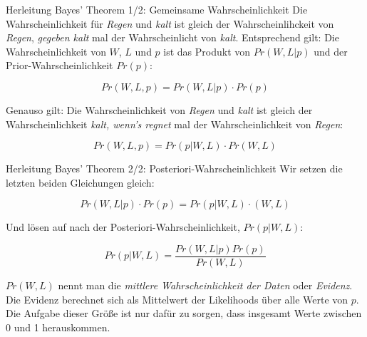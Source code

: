 \documentclass[
  ngerman,
  ignorenonframetext,
]{beamer}
\begin{document}
\begin{frame}{Herleitung Bayes' Theorem 1/2: Gemeinsame
Wahrscheinlichkeit}
\protect\hypertarget{herleitung-bayes-theorem-12-gemeinsame-wahrscheinlichkeit}{}
Die Wahrscheinlichkeit für \emph{Regen} und \emph{kalt} ist gleich der
Wahrscheinlihckeit von \emph{Regen}, \emph{gegeben kalt} mal der
Wahrscheinlicht von \emph{kalt}. Entsprechend gilt: Die
Wahrscheinlichkeit von \(W\), \(L\) und \(p\) ist das Produkt von
\(Pr(W,L|p)\) und der Prior-Wahrscheinlichkeit \(Pr(p)\):

\[Pr(W,L,p) = Pr(W,L|p) \cdot Pr(p)\]

Genauso gilt: Die Wahrscheinlichkeit von \emph{Regen} und \emph{kalt}
ist gleich der Wahrscheinlichkeit \emph{kalt, wenn's regnet} mal der
Wahrscheinlichkeit von \emph{Regen}:

\[Pr(W,L,p) = Pr(p|W,L) \cdot Pr(W, L)\]
\end{frame}

\begin{frame}{Herleitung Bayes' Theorem 2/2:
Posteriori-Wahrscheinlichkeit}
\protect\hypertarget{herleitung-bayes-theorem-22-posteriori-wahrscheinlichkeit}{}
Wir setzen die letzten beiden Gleichungen gleich:

\[Pr(W,L|p) \cdot Pr(p) = Pr(p|W,L) \cdot (W,L)\]

Und lösen auf nach der Posteriori-Wahrscheinlichkeit, \(Pr(p|W,L)\):

\[Pr(p|W,L) = \frac{Pr(W,L|p) Pr(p)}{Pr(W,L)}\]

\(Pr(W,L)\) nennt man die \emph{mittlere Wahrscheinlichkeit der Daten}
oder \emph{Evidenz}. Die Evidenz berechnet sich als Mittelwert der
Likelihoods über alle Werte von \(p\). Die Aufgabe dieser Größe ist nur
dafür zu sorgen, dass insgesamt Werte zwischen 0 und 1 herauskommen.
\end{frame}
\end{document}

